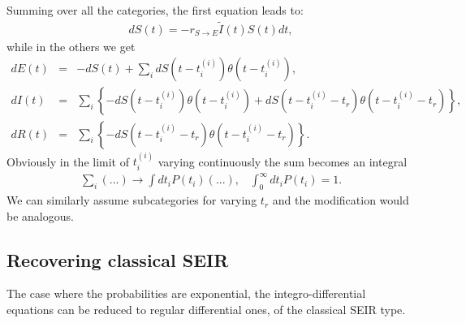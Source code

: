 \documentclass[a4paper,oneside,11pt]{article}
\begin{document}
Summing over all the categories, the first equation leads to:
\begin{eqnarray}
d S(t) = - r_{S\rightarrow E} \tilde{I}(t) S(t) dt,
\end{eqnarray}
while in the others we get
\begin{eqnarray}
d E(t) &=& -d S(t) + \sum_i d S(t-t^{(i)}_i) \theta(t-t^{(i)}_i) ,\nonumber\\
d I(t) &=& \sum_i  \left\{-d S(t-t^{(i)}_i) \theta(t-t^{(i)}_i)+ d S(t-t^{(i)}_i-t_r) \theta(t-t^{(i)}_i-t_r)\right\},\nonumber\\
d R(t) &=& \sum_i \left\{- d S(t - t^{(i)}_i - t_r) \theta(t-t^{(i)}_i-t_r)\right\}.
\label{eqs:corint}
\end{eqnarray}
Obviously in the limit of $t_i^{(i)}$ varying continuously the sum becomes an integral
\begin{eqnarray}
\sum_i  (...) \rightarrow \int dt_i P(t_i) (...), \;\;\; \int_0^\infty dt_i P(t_i) = 1.
\end{eqnarray}
We can similarly assume subcategories for varying $t_r$ and the modification would be analogous.

\subsection{Recovering classical SEIR}

The case where the probabilities are exponential, the integro-differential equations can be reduced to regular differential ones, of the classical SEIR type.
\end{document}

